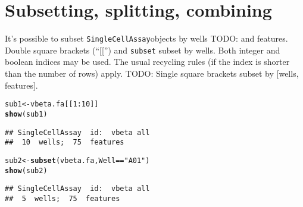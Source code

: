 \documentclass{article}\usepackage{graphicx, color}
\makeatletter
\newcommand{\hlfunctioncall}[1]{\textcolor[rgb]{0.501960784313725,0,0.329411764705882}{\textbf{#1}}}%
\newcommand{\hlstring}[1]{\textcolor[rgb]{0.6,0.6,1}{#1}}%
\newenvironment{kframe}{%
 \def\at@end@of@kframe{}%
 \ifinner\ifhmode%
  \def\at@end@of@kframe{\end{minipage}}%
  \begin{minipage}{\columnwidth}%
 \fi\fi%
 \def\FrameCommand##1{\hskip\@totalleftmargin \hskip-\fboxsep
 \colorbox{shadecolor}{##1}\hskip-\fboxsep
     \hskip-\linewidth \hskip-\@totalleftmargin \hskip\columnwidth}%
 \MakeFramed {\advance\hsize-\width
   \@totalleftmargin\z@ \linewidth\hsize
   \@setminipage}}%
 {\par\unskip\endMakeFramed%
 \at@end@of@kframe}
\newenvironment{knitrout}{}{} %
\newcommand{\future}[1]{TODO: {\color{gray} #1}}
\newcommand{\sca}{\texttt{SingleCellAssay}}
\makeatother
\begin{document}
\section{Subsetting, splitting, combining}
It's possible to subset \sca objects by wells \future{ and features}.
Double square brackets (``[['') and \texttt{subset} subset by wells. 
Both integer and boolean indices may be used.
The usual recycling rules (if the index is shorter than the number of rows) apply.
\future{Single square brackets subset by [wells, features].}
\begin{knitrout}
\color{fgcolor}\begin{kframe}
\begin{alltt}
sub1 <- vbeta.fa[[1:10]]
\hlfunctioncall{show}(sub1)
\end{alltt}
\begin{verbatim}
## SingleCellAssay  id:  vbeta all 
##  10  wells;  75  features
\end{verbatim}
\begin{alltt}
sub2 <- \hlfunctioncall{subset}(vbeta.fa, Well == \hlstring{"A01"})
\hlfunctioncall{show}(sub2)
\end{alltt}
\begin{verbatim}
## SingleCellAssay  id:  vbeta all 
##  5  wells;  75  features
\end{verbatim}
\end{kframe}
\end{knitrout}
\end{document}
